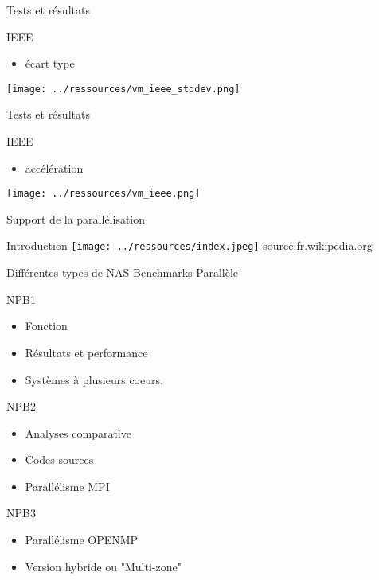 \documentclass{beamer}
\begin{document}
\begin{frame}{Tests et résultats}
    \begin{block}{IEEE}
    \begin{itemize}
        \item écart type
    \end{itemize}
 \centering\texttt{[image: ../ressources/vm\_ieee\_stddev.png]}
    \end{block}

\end{frame}

\begin{frame}{Tests et résultats}
    \begin{block}{IEEE}
    \begin{itemize}
        \item accélération
    \end{itemize}
 \centering\texttt{[image: ../ressources/vm\_ieee.png]}
    \end{block}
    
\end{frame}
\begin{frame}{Support de la parallélisation}

  \begin{block}{Introduction}
    \texttt{[image: ../ressources/index.jpeg]}
    source:fr.wikipedia.org
  \end{block}

\end{frame}

\begin{frame}{Différentes types de NAS Benchmarks Parallèle}

  \begin{block}{NPB1}
    \begin{itemize}
    \item Fonction
    \item Résultats et performance
    \item Systèmes à plusieurs coeurs.
    \end{itemize}
  \end{block}
  
  \begin{block}{NPB2}
    \begin{itemize}
    \item Analyses comparative
    \item Codes sources
    \item Parallélisme  MPI
    \end{itemize}
  \end{block}
  
  \begin{block}{NPB3}
    \begin{itemize}
    \item Parallélisme OPENMP
    \item Version hybride ou "Multi-zone" 
    \end{itemize}
  \end{block}

\end{frame}
\end{document}
